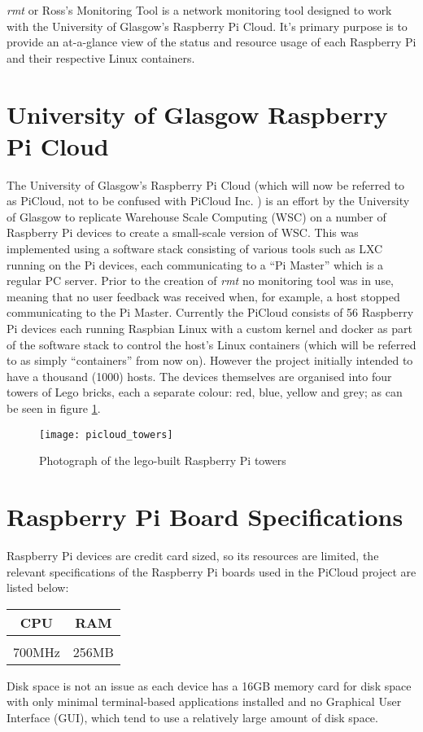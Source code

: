 \emph{rmt} or Ross's Monitoring Tool is a network monitoring tool 
designed to work with the University of Glasgow's Raspberry Pi 
Cloud. It's primary purpose is to provide an at-a-glance view of the 
status and resource usage of each Raspberry Pi and their respective 
Linux containers.

\section{University of Glasgow Raspberry Pi Cloud}
\label{intro:picloud}

The University of Glasgow's Raspberry Pi Cloud \citep{glapicloud, picloudblog} (which will now be 
referred to as PiCloud, not to be confused with PiCloud Inc. \citeyearpar{picloudinc}) is an effort by the University of Glasgow to replicate Warehouse Scale Computing (WSC) \citep{barroso2009datacenter} on a number of Raspberry Pi \citep{rasppi} devices to create a small-scale version of WSC.
This was implemented using a software stack consisting of various tools such as LXC \citeyearpar{lxc} running on the Pi devices, each communicating to a ``Pi Master'' which is a regular PC server.
Prior to the creation of \emph{rmt} no monitoring tool was in use, meaning that no user feedback was received when, for example, a host stopped communicating to the Pi Master.
Currently the PiCloud consists of 56 Raspberry Pi devices each running Raspbian Linux \citeyearpar{raspbian} with a custom kernel and docker \citeyearpar{docker} as part of the software stack to control the host's Linux containers (which will be referred to as simply ``containers'' from now on).
However the project initially intended to have a thousand (1000) hosts.
The devices themselves are organised into four towers of Lego bricks, each a separate colour: red, blue, yellow and grey; as can be seen in figure \ref{fig:pitowers}.

\begin{figure}[t]
	\centering
	\texttt{[image: picloud\_towers]}
	\caption{Photograph of the lego-built Raspberry Pi towers}
	\label{fig:pitowers}
\end{figure}

\section{Raspberry Pi Board Specifications}
Raspberry Pi devices are credit card sized, so its resources are limited, the relevant specifications of the Raspberry Pi boards used in the PiCloud project are listed below:

\begin{center}
\begin{tabular}{c | c}
	CPU & RAM \\
	\hline \\
	700MHz & 256MB
\end{tabular}
\end{center}

Disk space is not an issue as each device has a 16GB memory card for disk space with only minimal terminal-based applications installed and no Graphical User Interface (GUI), which tend to use a relatively large amount of disk space.